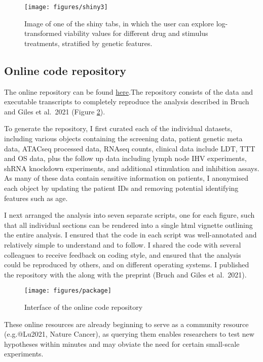 \documentclass[11pt, a4paper, twosided]{book}
\begin{document}
\begin{figure}

{\centering \texttt{[image: figures/shiny3]} 

}

\caption{Image of one of the shiny tabs, in which the user can explore log-transformed viability values for different drug and stimulus treatments, stratified by genetic features.}\label{fig:shinyApp3}
\end{figure}
\hypertarget{online-code-repository}{%
\subsection{Online code repository}\label{online-code-repository}}

The online repository can be found \href{https://github.com/Huber-group-EMBL/CLLCytokineScreen2021}{here}.The repository consists of the data and executable transcripts to completely reproduce the analysis described in Bruch and Giles et al.~2021 (Figure \ref{fig:package1}).

To generate the repository, I first curated each of the individual datasets, including various objects containing the screening data, patient genetic meta data, ATACseq processed data, RNAseq counts, clinical data include LDT, TTT and OS data, plus the follow up data including lymph node IHV experiments, shRNA knockdown experiments, and additional stimulation and inhibition assays. As many of these data contain sensitive information on patients, I anonymised each object by updating the patient IDs and removing potential identifying features such as age.

I next arranged the analysis into seven separate scripts, one for each figure, such that all individual sections can be rendered into a single html vignette outlining the entire analysis. I ensured that the code in each script was well-annotated and relatively simple to understand and to follow. I shared the code with several colleagues to receive feedback on coding style, and ensured that the analysis could be reproduced by others, and on different operating systems. I published the repository with the along with the preprint (Bruch and Giles et al.~2021).


\begin{figure}

{\centering \texttt{[image: figures/package]} 

}

\caption{Interface of the online code repository}\label{fig:package1}
\end{figure}
These online resources are already beginning to serve as a community resource (e.g.@Lu2021, Nature Cancer), as querying them enables researchers to test new hypotheses within minutes and may obviate the need for certain small-scale experiments.
\end{document}
